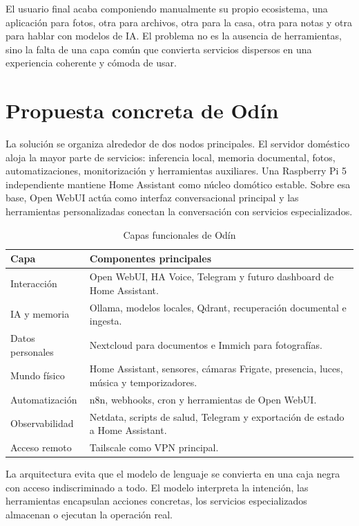 El usuario final acaba componiendo manualmente su propio ecosistema, una aplicación para fotos, otra para archivos, otra para la casa, otra para notas y otra para hablar con modelos de IA. El problema no es la ausencia de herramientas, sino la falta de una capa común que convierta servicios dispersos en una experiencia coherente y cómoda de usar.

\section{Propuesta concreta de Odín}
La solución se organiza alrededor de dos nodos principales. El servidor doméstico aloja la mayor parte de servicios: inferencia local, memoria documental, fotos, automatizaciones, monitorización y herramientas auxiliares. Una Raspberry Pi 5 independiente mantiene Home Assistant como núcleo domótico estable. Sobre esa base, Open WebUI actúa como interfaz conversacional principal y las herramientas personalizadas conectan la conversación con servicios especializados.

\begin{table}[H]
  \centering
  \caption{Capas funcionales de Odín}
  \label{tab:capas-odin-seguimiento}
  \begin{tabularx}{\textwidth}{lX}
    \toprule
    Capa & Componentes principales \\
    \midrule
    Interacción & Open WebUI, HA Voice, Telegram y futuro dashboard de Home Assistant. \\
    IA y memoria & Ollama, modelos locales, Qdrant, recuperación documental e ingesta. \\
    Datos personales & Nextcloud para documentos e Immich para fotografías. \\
    Mundo físico & Home Assistant, sensores, cámaras Frigate, presencia, luces, música y temporizadores. \\
    Automatización & n8n, webhooks, cron y herramientas de Open WebUI. \\
    Observabilidad & Netdata, scripts de salud, Telegram y exportación de estado a Home Assistant. \\
    Acceso remoto & Tailscale como VPN principal. \\
    \bottomrule
  \end{tabularx}
\end{table}

La arquitectura evita que el modelo de lenguaje se convierta en una caja negra con acceso indiscriminado a todo. El modelo interpreta la intención, las herramientas encapsulan acciones concretas, los servicios especializados almacenan o ejecutan la operación real.

